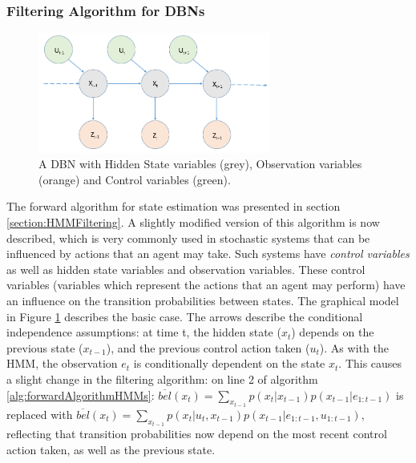 \subsubsection{Filtering Algorithm for DBNs}\label{subsubsec:filteringDBN}
\begin{figure}
    \centering
    \includegraphics[width = 0.68\textwidth]{Chapters/BackgroundKnowledgeAndRelatedWork/MultiAgentTargetDetectionBackground/Figs/HMMs/HMMWithControl.png}
    \caption{A DBN with Hidden State variables (grey), Observation variables (orange) and Control variables (green).}
    \label{fig:HMMWithControlVariablesExample}
\end{figure}
The forward algorithm for state estimation was presented in section \ref{section:HMMFiltering}. A slightly modified version of this algorithm is now described, which is very commonly used in stochastic systems that can be influenced by actions that an agent may take. Such systems have \textit{control variables} as well as hidden state variables and observation variables. These control variables (variables which represent the actions that an agent may perform) have an influence on the transition probabilities between states. The graphical model in Figure \ref{fig:HMMWithControlVariablesExample} describes the basic case. The arrows describe the conditional independence assumptions: at time t, the hidden state ($x_t$) depends on the previous state ($x_{t-1}$), and the previous control action taken ($u_t$). As with the HMM, the observation $e_t$ is conditionally dependent on the state $x_t$. This causes a slight change in the filtering algorithm: on line 2 of algorithm \ref{alg:forwardAlgorithmHMMs}: $\overline{bel}(x_t) = \sum_{x_{t-1}} p(x_t | x_{t-1}) p(x_{t-1} | e_{1:t-1}) $ is replaced with $\overline{bel}(x_t) = \sum_{x_{t-1}} p(x_t | u_t, x_{t-1}) p(x_{t-1} | e_{1:t-1}, u_{1:t-1}) $, reflecting that transition probabilities now depend on the most recent control action taken, as well as the previous state.





